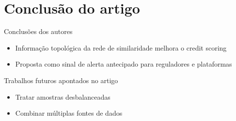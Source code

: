
\section{Conclusão do artigo}

\begin{frame}{Conclusões dos autores}
  \begin{itemize}
    \item Informação topológica da rede de similaridade melhora o credit scoring
    \item Proposta como sinal de alerta antecipado para reguladores e plataformas
  \end{itemize}
\end{frame}

\begin{frame}{Trabalhos futuros apontados no artigo}
  \begin{itemize}
    \item Tratar amostras desbalanceadas
    \item Combinar múltiplas fontes de dados
  \end{itemize}
\end{frame}
